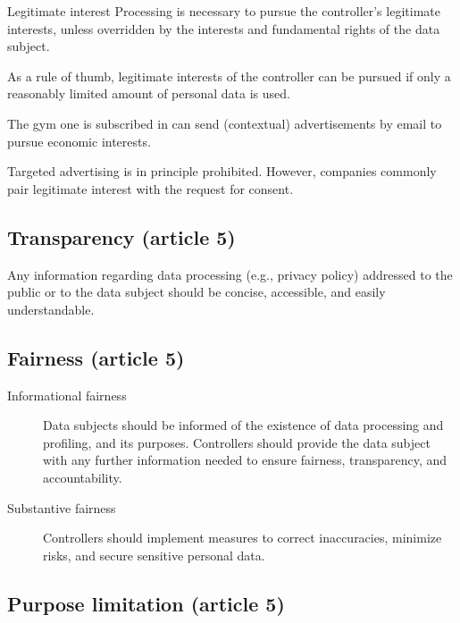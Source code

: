 \begin{descriptionlist}
    \item[Legitimate interest]
        Processing is necessary to pursue the controller's legitimate interests, unless overridden by the interests and fundamental rights of the data subject.
    \begin{remark}
        As a rule of thumb, legitimate interests of the controller can be pursued if only a reasonably limited amount of personal data is used.
    \end{remark}
    \begin{example}
        The gym one is subscribed in can send (contextual) advertisements by email to pursue economic interests.
    \end{example}
    \begin{remark}
        Targeted advertising is in principle prohibited. However, companies commonly pair legitimate interest with the request for consent.
    \end{remark}
\end{descriptionlist}


\subsection{Transparency (article 5)} 

Any information regarding data processing (e.g., privacy policy) addressed to the public or to the data subject should be concise, accessible, and easily understandable.


\subsection{Fairness (article 5)}

\begin{description}
    \item[Informational fairness] 
        Data subjects should be informed of the existence of data processing and profiling, and its purposes. Controllers should provide the data subject with any further information needed to ensure fairness, transparency, and accountability.

    \item[Substantive fairness] 
        Controllers should implement measures to correct inaccuracies, minimize risks, and secure sensitive personal data.
\end{description}


\subsection{Purpose limitation (article 5)} 

